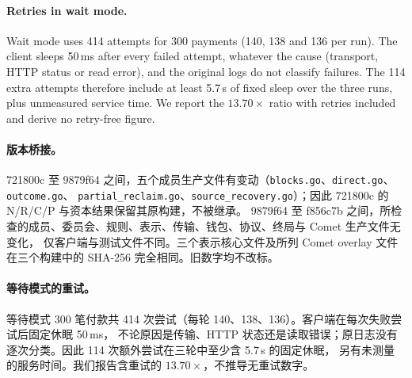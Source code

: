 \paragraph{Retries in wait mode.}
Wait mode uses 414 attempts for 300 payments (140, 138 and 136 per run). The client
sleeps 50\,ms after every failed attempt, whatever the cause (transport, HTTP status or
read error), and the original logs do not classify failures. The 114 extra attempts
therefore include at least 5.7\,s of fixed sleep over the three runs, plus unmeasured
service time. We report the $13.70\times$ ratio with retries included and derive no
retry-free figure.
 
\paragraph{版本桥接。}
721800c 至 9879f64 之间，五个成员生产文件有变动（\texttt{blocks.go}、\texttt{direct.go}、\texttt{outcome.go}、
\texttt{partial\_reclaim.go}、\texttt{source\_recovery.go}）；因此 721800c 的 N/R/C/P 与资本结果保留其原构建，不被继承。
9879f64 至 f856c7b 之间，所检查的成员、委员会、规则、表示、传输、钱包、协议、终局与 Comet 生产文件无变化，
仅客户端与测试文件不同。三个表示核心文件及所列 Comet overlay 文件在三个构建中的 SHA-256 完全相同。旧数字均不改标。
 
\paragraph{等待模式的重试。}
等待模式 300 笔付款共 414 次尝试（每轮 140、138、136）。客户端在每次失败尝试后固定休眠 50\,ms，
不论原因是传输、HTTP 状态还是读取错误；原日志没有逐次分类。因此 114 次额外尝试在三轮中至少含 5.7\,s 的固定休眠，
另有未测量的服务时间。我们报告含重试的 $13.70\times$，不推导无重试数字。
 